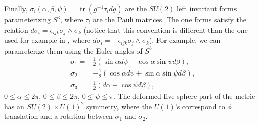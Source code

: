 \documentclass[11pt]{article}
\newcommand{\tr}{\mathop{\mathrm{tr}}}
\begin{document}
\begin{itemize}
Finally, $\sigma_i(\alpha,\beta,\psi) = \tr(g^{-1}\tau_i d g)$ are the $SU(2)$ left invariant forms parameterizing $S^3$, where $\tau_i$ are the Pauli matrices. The one forms satisfy the relation $d\sigma_i  = \epsilon_{i j k} \sigma_j \wedge \sigma_k$ (notice that this convention is different than the one used for example in \cite{Buchel:2000cn}, where $d\sigma_i  = -\epsilon_{i j k} \sigma_j \wedge \sigma_k$).
For example, we can parameterize them using the Euler angles of $S^3$
\begin{align}
\sigma_1 = &\frac{1}{2}\left(\sin\alpha d \psi -\cos\alpha \sin\psi d\beta\right),\nonumber\\
\sigma_2 = &-\frac{1}{2}\left(\cos\alpha d \psi +\sin\alpha \sin\psi d\beta\right),\nonumber\\
\sigma_3 = &\frac{1}{2}\left(d \alpha +\cos\psi d\beta\right),
\end{align}
$0 \leq \alpha \leq 2\pi$, $0 \leq \beta \leq 2\pi$, $0 \leq \psi \leq \pi$.
The deformed five-sphere part of the metric has an $SU(2)\times U(1)^2$ symmetry, where the $U(1)$'s correspond to $\phi$ translation and a rotation between $\sigma_1$ and $\sigma_2$.
%
%
%

\end{itemize}
\end{document}
